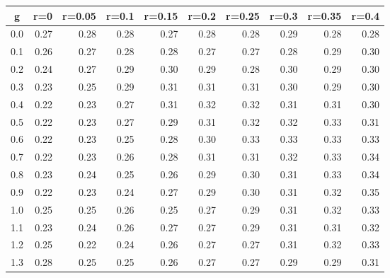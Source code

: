 %
\begin{table}[!tbp]
 \begin{center}
 \begin{tabular}{rrrrrrrrrr}\hline\hline
\multicolumn{1}{c}{g}&\multicolumn{1}{c}{r=0}&\multicolumn{1}{c}{r=0.05}&\multicolumn{1}{c}{r=0.1}&\multicolumn{1}{c}{r=0.15}&\multicolumn{1}{c}{r=0.2}&\multicolumn{1}{c}{r=0.25}&\multicolumn{1}{c}{r=0.3}&\multicolumn{1}{c}{r=0.35}&\multicolumn{1}{c}{r=0.4}\tabularnewline
\hline
0.0&0.27&0.28&0.28&0.27&0.28&0.28&0.29&0.28&0.28\tabularnewline
0.1&0.26&0.27&0.28&0.28&0.27&0.27&0.28&0.29&0.30\tabularnewline
0.2&0.24&0.27&0.29&0.30&0.29&0.28&0.30&0.29&0.30\tabularnewline
0.3&0.23&0.25&0.29&0.31&0.31&0.31&0.30&0.29&0.30\tabularnewline
0.4&0.22&0.23&0.27&0.31&0.32&0.32&0.31&0.31&0.30\tabularnewline
0.5&0.22&0.23&0.27&0.29&0.31&0.32&0.32&0.33&0.31\tabularnewline
0.6&0.22&0.23&0.25&0.28&0.30&0.33&0.33&0.33&0.33\tabularnewline
0.7&0.22&0.23&0.26&0.28&0.31&0.31&0.32&0.33&0.34\tabularnewline
0.8&0.23&0.24&0.25&0.26&0.29&0.30&0.31&0.33&0.34\tabularnewline
0.9&0.22&0.23&0.24&0.27&0.29&0.30&0.31&0.32&0.35\tabularnewline
1.0&0.25&0.25&0.26&0.25&0.27&0.29&0.31&0.32&0.33\tabularnewline
1.1&0.23&0.24&0.26&0.27&0.27&0.29&0.31&0.31&0.32\tabularnewline
1.2&0.25&0.22&0.24&0.26&0.27&0.27&0.31&0.32&0.33\tabularnewline
1.3&0.28&0.25&0.25&0.26&0.27&0.27&0.29&0.29&0.31\tabularnewline
\hline
\end{tabular}

\end{center}

\end{table}

